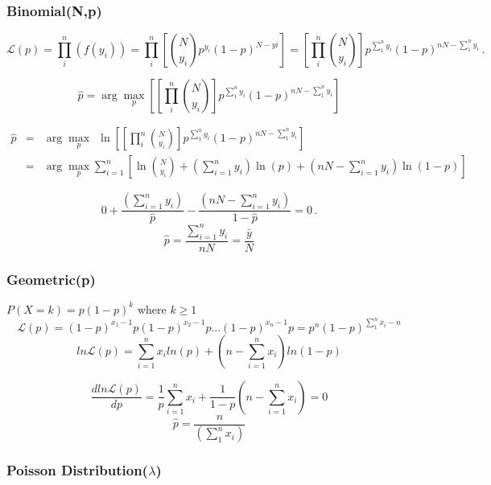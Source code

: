 \documentclass[]{article}
\begin{document}
\hypertarget{binomialnp}{%
\subsubsection{Binomial(N,p)}\label{binomialnp}}

\[
\mathcal{L}(p) = \prod_i^n(f(y_i)) =  \prod_i^n \left[ {{N}\choose{y_i}}p^{y_i} (1-p)^{N- yi} \right] = \left[ \prod_i^n {{N}\choose{y_i}} \right] p^{\sum_1^n y_i} (1-p)^{nN - \sum_1^n{y_i}} \,.\]

\[\hat{p} = \arg\max_p \left[ \left[ \prod_i^n {{N}\choose{y_i}} \right] p^{\sum_1^n y_i} (1-p)^{nN - \sum_1^n{y_i}}\right]\]

\[
\begin{array}{rcl} \hat{p} & = & \displaystyle\arg\max_p\ \  \ln\left[ \left[ \prod_i^n {{N}\choose{y_i}} \right] p^{\sum_1^n y_i} (1-p)^{nN - \sum_1^n{y_i}}\right] \\ & = & \displaystyle \arg\limits\max_p  \sum_{i=1}^n\left[ \ln {{N}\choose{y_i}} + \left( \sum_{i=1}^n y_i \right)\ln(p) + \left( nN - \sum_{i=1}^n y_i \right)\ln(1-p) \right] \end{array}
\]

\[
0 + \frac{\left( \sum_{i=1}^n y_i \right)}{\hat{p}} - \frac{\left(n N - \sum_{i=1}^n y_i \right)}{1-\hat{p}} = 0 \,.
\] \[\hat{p} = \frac{\sum_{i=1}^n y_i}{nN} = \frac{\bar{y}}{N} \]

\hypertarget{geometricp}{%
\subsubsection{Geometric(p)}\label{geometricp}}

\(P(X=k)=p(1-p)^k\) where \(k\ge1\) \[
\mathcal{L}\left(p \right)={\left(1-p \right)}^{{x}_{1}-1}p {\left(1-p \right)}^{{x}_{2}-1}p...{\left(1-p \right)}^{{x}_{n}-1}p ={p}^{n}{\left(1-p \right)}^{\sum_{1}^{n}{x}_{i}-n}
\]
\[ln\mathcal{L}(p)=\sum_{i=1}^{n}{x}_{i}ln(p)+\left(n-\sum_{i=1}^{n}{x}_{i} \right)ln\left(1-p \right)\]

\[
\frac{dln\mathcal{L}(p)}{dp}=\frac{1}{p}\sum_{i=1}^{n}{x}_{i}+\frac{1}{1-p}\left(n-\sum_{i=1}^{n}{x}_{i} \right)=0
\] \[\hat{p}=\frac{n}{\left(\sum_{1}^{n}{x}_{i} \right)}\]

\hypertarget{poisson-distributionlambda}{%
\subsubsection{\texorpdfstring{Poisson
Distribution(\(\lambda\))}{Poisson Distribution(\textbackslash{}lambda)}}\label{poisson-distributionlambda}}
\end{document}
